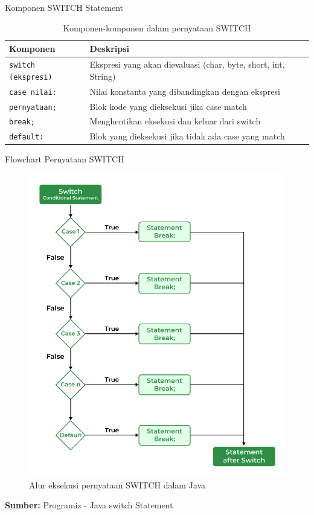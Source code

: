 \documentclass{beamer}
\begin{document}
\begin{frame}{Komponen SWITCH Statement}
  \begin{table}
    \footnotesize
    \begin{tabular}{p{}|p{}}
    \textbf{Komponen} & \textbf{Deskripsi} \\
    \hline
    \rowcolor{lightgray}
    \texttt{switch (ekspresi)} & Ekspresi yang akan dievaluasi (char, byte, short, int, String) \\
    \rowcolor{white}
    \texttt{case nilai:} & Nilai konstanta yang dibandingkan dengan ekspresi \\
    \rowcolor{lightgray}
    \texttt{pernyataan;} & Blok kode yang dieksekusi jika case match \\
    \rowcolor{white}
    \texttt{break;} & Menghentikan eksekusi dan keluar dari switch \\
    \rowcolor{lightgray}
    \texttt{default:} & Blok yang dieksekusi jika tidak ada case yang match \\
    \end{tabular}
    \caption{Komponen-komponen dalam pernyataan SWITCH}
  \end{table}
\end{frame}

\begin{frame}[fragile]{Flowchart Pernyataan SWITCH}
  \begin{figure}[h]
    \centering
    \includegraphics[width=0.45\linewidth]{Struktur Kontrol 2/switch-flowchart.png}
    \caption{Alur eksekusi pernyataan SWITCH dalam Java}
    \label{fig:switch-flowchart}
  \end{figure}
  \textbf{Sumber: }Programiz - Java switch Statement
\end{frame}
\end{document}
